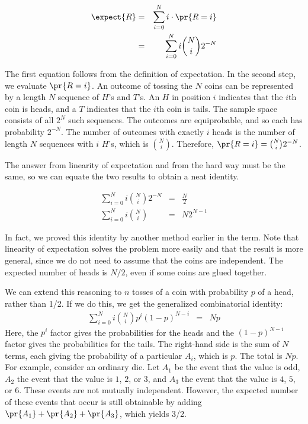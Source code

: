 \begin{eqnarray*}
\expect{R}  & = & \sum_{i=0}^N i \cdot \pr{R = i} \\
        & = & \sum_{i=0}^N i \binom{N}{i} 2^{-N}
\end{eqnarray*}

The first equation follows from the definition of expectation.  In the
second step, we evaluate $\pr{R = i}$.  An outcome of tossing the $N$
coins can be represented by a length $N$ sequence of $H$'s and $T$'s.
An $H$ in position $i$ indicates that the $i$th coin is heads, and a
$T$ indicates that the $i$th coin is tails.  The sample space
consists of all $2^N$ such sequences.  The outcomes are equiprobable,
and so each has probability $2^{-N}$.  The number of outcomes with
exactly $i$ heads is the number of length $N$ sequences with $i$
$H$'s, which is $\binom{N}{i}$.  Therefore, $\pr{R = i} = \binom{N}{i}
2^{-N}$.

The answer from linearity of expectation and from the hard way must be
the same, so we can equate the two results to obtain a neat identity.

\begin{eqnarray*}
\sum_{i=0}^N i \binom{N}{i} 2^{-N} & = & \frac{N}{2} \\
\sum_{i=0}^N i \binom{N}{i} & = & N2^{N-1}
\end{eqnarray*}

In fact, we proved this identity by another method earlier in the
term.  Note that linearity of expectation solves the problem more
easily and that the result is more general, since we do not need to
assume that the coins are independent.  The expected number of
heads is $N/2$, even if some coins are glued together.

We can extend this reasoning to $n$ tosses of a coin with probability $p$
of a head, rather than 1/2.  If we do this, we get the generalized
combinatorial identity:
\begin{eqnarray*}
\sum_{i=0}^N i \binom{N}{i} p^i (1-p)^{N-i} & = & N p
\end{eqnarray*}
Here, the $p^i$ factor gives the probabilities for the heads and the
$(1-p)^{N-i}$ factor gives the probabilities for the tails.  The
right-hand side is the sum of $N$ terms, each giving the probability
of a particular $A_i$, which is $p$.  The total is $N p$.  For
example, consider an ordinary die.  Let $A_1$ be the event that the
value is odd, $A_2$ the event that the value is $1$, $2$, or $3$, and
$A_3$ the event that the value is $4$, $5$, or $6$.  These events are
not mutually independent.  However, the expected number of these
events that occur is still obtainable by adding $\pr{A_1} + \pr{A_2} +
\pr{A_3}$, which yields 3/2.

